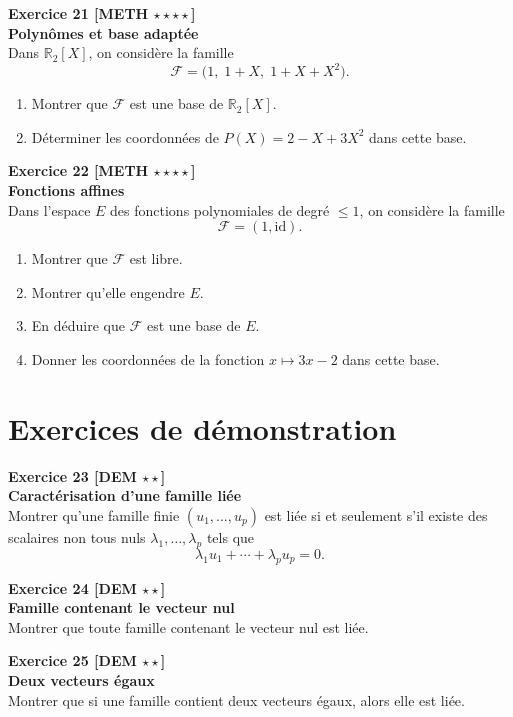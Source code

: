\documentclass[11pt,a4paper]{article}
\begin{document}
\textbf{Exercice 21 [METH $\star\star\star\star$]}\\
\textbf{Polynômes et base adaptée}\\
Dans \(\mathbb{R}_2[X]\), on considère la famille
\[
\mathcal F=\big(1,\;1+X,\;1+X+X^2\big).
\]
\begin{enumerate}[label=\alph*)]
    \item Montrer que \(\mathcal F\) est une base de \(\mathbb{R}_2[X]\).
    \item Déterminer les coordonnées de \(P(X)=2-X+3X^2\) dans cette base.
\end{enumerate}

\textbf{Exercice 22 [METH $\star\star\star\star$]}\\
\textbf{Fonctions affines}\\
Dans l’espace \(E\) des fonctions polynomiales de degré \(\le 1\), on considère la famille
\[
\mathcal F=(1,\mathrm{id}).
\]
\begin{enumerate}[label=\alph*)]
    \item Montrer que \(\mathcal F\) est libre.
    \item Montrer qu’elle engendre \(E\).
    \item En déduire que \(\mathcal F\) est une base de \(E\).
    \item Donner les coordonnées de la fonction \(x\mapsto 3x-2\) dans cette base.
\end{enumerate}

\newpage

\section*{Exercices de démonstration}

\textbf{Exercice 23 [DEM $\star\star$]}\\
\textbf{Caractérisation d’une famille liée}\\
Montrer qu’une famille finie \((u_1,\dots,u_p)\) est liée si et seulement s’il existe des scalaires non tous nuls \(\lambda_1,\dots,\lambda_p\) tels que
\[
\lambda_1u_1+\cdots+\lambda_pu_p=0.
\]

\textbf{Exercice 24 [DEM $\star\star$]}\\
\textbf{Famille contenant le vecteur nul}\\
Montrer que toute famille contenant le vecteur nul est liée.

\textbf{Exercice 25 [DEM $\star\star$]}\\
\textbf{Deux vecteurs égaux}\\
Montrer que si une famille contient deux vecteurs égaux, alors elle est liée.
\end{document}
